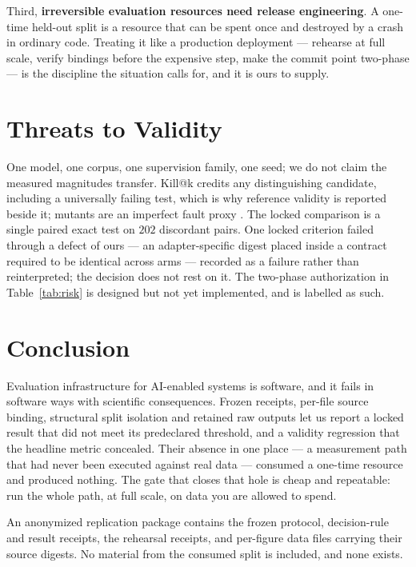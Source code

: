 \documentclass[10pt,conference]{IEEEtran}
\makeatletter
\newcommand{\killk}[1]{Kill@#1}
\makeatother
\begin{document}
Third, \textbf{irreversible evaluation resources need release engineering}. A
one-time held-out split is a resource that can be spent once and destroyed by a
crash in ordinary code. Treating it like a production deployment --- rehearse at
full scale, verify bindings before the expensive step, make the commit point
two-phase --- is the discipline the situation calls for, and it is ours to
supply.

\section{Threats to Validity}

One model, one corpus, one supervision family, one seed; we do not claim the
measured magnitudes transfer. \killk{k} credits any distinguishing candidate,
including a universally failing test, which is why reference validity is
reported beside it; mutants are an imperfect fault proxy
\cite{just2014mutants}. The locked comparison is a single paired exact test on
$202$ discordant pairs. One locked criterion failed through a defect of ours ---
an adapter-specific digest placed inside a contract required to be identical
across arms --- recorded as a failure rather than reinterpreted; the decision
does not rest on it. The two-phase authorization in Table~\ref{tab:risk} is
designed but not yet implemented, and is labelled as such.

\section{Conclusion}

Evaluation infrastructure for AI-enabled systems is software, and it fails in
software ways with scientific consequences. Frozen receipts, per-file source
binding, structural split isolation and retained raw outputs let us report a
locked result that did not meet its predeclared threshold, and a validity
regression that the headline metric concealed. Their absence in one place ---
a measurement path that had never been executed against real data --- consumed a
one-time resource and produced nothing. The gate that closes that hole is cheap
and repeatable: run the whole path, at full scale, on data you are allowed to
spend.

An anonymized replication package contains the frozen protocol, decision-rule
and result receipts, the rehearsal receipts, and per-figure data files carrying
their source digests. No material from the consumed split is included, and none
exists.



\end{document}
